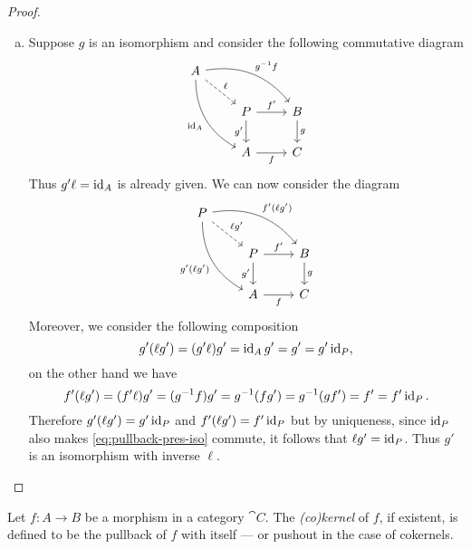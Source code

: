 \begin{proof}
\begin{enumerate}[(a)]
\item Suppose \(g\) is an isomorphism and consider the following commutative
  diagram
  \[
  \begin{tikzcd}
  A \ar[rrd, "g^{-1} f", bend left]
  \ar[drd, "\Id_{A}"', bend right]
  \ar[rd, "\ell", dashed]
  & &
  \\
  &P \ar[r, "f'"] \ar[d, "g'"']
  &B \ar[d, "g"]
  \\
  &A \ar[r, "f"'] &C
  \end{tikzcd}
  \]
  Thus \(g' \ell = \operatorname{id}_A\) is already given. We can now consider the diagram
  \begin{equation}\label{eq:pullback-pres-iso}
  \begin{tikzcd}
  P \ar[rrd, "f' (\ell g')", bend left]
  \ar[drd, "g' (\ell g')"', bend right]
  \ar[rd, "\ell g'", dashed]
  & &
  \\
  &P \ar[r, "f'"] \ar[d, "g'"']
  &B \ar[d, "g"]
  \\
  &A \ar[r, "f"'] &C
  \end{tikzcd}
  \end{equation}
  Moreover, we consider the following composition
  \[
  g' (\ell g') = (g' \ell) g' = \operatorname{id}_A g' = g' = g' \operatorname{id}_P,
  \]
  on the other hand we have
  \[
  f' (\ell g') = (f' \ell) g'
  = (g^{-1} f) g' = g^{-1} (f g')
  = g^{-1} (g f') = f' = f' \operatorname{id}_P.
  \]
  Therefore \(g' (\ell g') = g' \operatorname{id}_P\) and \(f' (\ell g') = f' \operatorname{id}_P\) but by
  uniqueness, since \(\operatorname{id}_P\) also makes \cref{eq:pullback-pres-iso} commute, it
  follows that \(\ell g' = \operatorname{id}_P\). Thus \(g'\) is an isomorphism with inverse
  \(\ell\).
\end{enumerate}
\end{proof}

\begin{definition}
\label{def:kernel-cokernel}
Let \(f: A \to B\) be a morphism in a category \(\cat C\). The \emph{(co)kernel}
of \(f\), if existent, is defined to be the pullback of \(f\) with itself --- or
pushout in the case of cokernels.
\end{definition}
